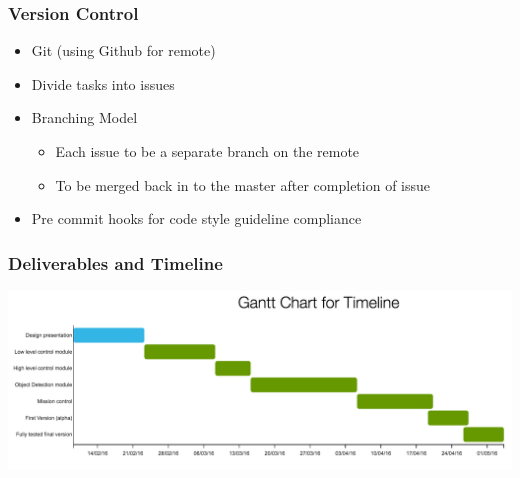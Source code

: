 \documentclass{beamer}
\begin{document}
\begin{frame}
\frametitle{Version Control}
\begin{itemize}
\item Git (using Github for remote)
\item Divide tasks into issues
\item Branching Model
\begin{itemize}
\item Each issue to be a separate branch on the remote
\item To be merged back in to the master after completion of issue
\end{itemize}
\item Pre commit hooks for code style guideline compliance
\end{itemize}
\end{frame}

\begin{frame}
\frametitle{Deliverables and Timeline}
\includegraphics[scale=0.23]{assets/gannt/chart.png}
\end{frame}

\end{document}
